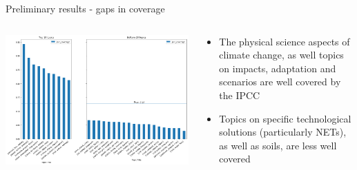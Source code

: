 \documentclass[9pt]{beamer}
\begin{document}
\begin{frame}{Preliminary results - gaps in coverage}

\begin{columns}
	\begin{column}{0.7\linewidth}
		\begin{center}
			\includegraphics[width=\linewidth]{../plots/ipcc_topics_386.png}
		\end{center}
	\end{column}
	\begin{column}{0.3\linewidth}
		\begin{center}
			\begin{itemize}
				\item The physical science aspects of climate change, as well topics on impacts, adaptation and scenarios are well covered by the IPCC
				\item Topics on specific technological solutions (particularly NETs), as well as soils, are less well covered
			\end{itemize}
		\end{center}
	\end{column}
\end{columns}

\end{frame}
\end{document}

